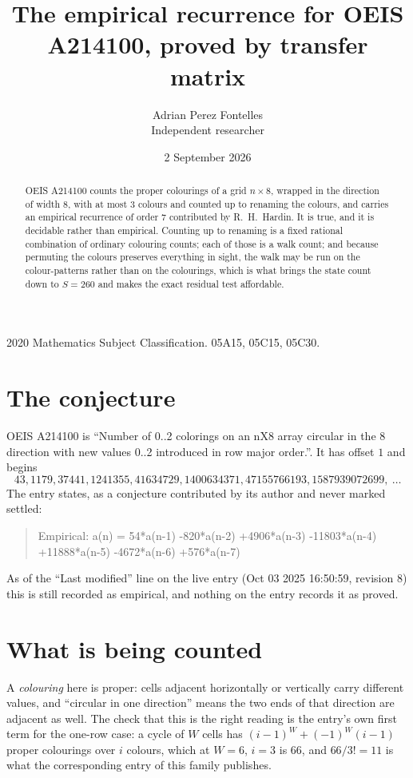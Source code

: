 \documentclass[11pt,a4paper]{article}
\title{The empirical recurrence for OEIS A214100, proved by transfer matrix}
\author{Adrian Perez Fontelles\\ \small Independent researcher}
\date{2 September 2026}
\theoremstyle{plain}
\theoremstyle{definition}
\begin{document}
\maketitle

\begin{abstract}
OEIS A214100 counts the proper colourings of a grid $n\times8$, wrapped in the direction of width $8$, with at most $3$ colours and
counted up to renaming the colours, and carries an empirical recurrence of order $7$
contributed by R.~H.~Hardin. It is true, and it is decidable rather than empirical. Counting
up to renaming is a fixed rational combination of ordinary colouring counts; each of those is
a walk count; and because permuting the colours preserves everything in sight, the walk may be
run on the colour-patterns rather than on the colourings, which is what brings the state count
down to $S=260$ and makes the exact residual test affordable.
\end{abstract}

\noindent\small 2020 Mathematics Subject Classification. 05A15, 05C15, 05C30.\normalsize

\section{The conjecture}

OEIS A214100 is ``Number of 0..2 colorings on an nX8 array circular in the 8 direction with new values 0..2 introduced in row major order.''. It has offset $1$ and begins
\[
43, 1179, 37441, 1241355, 41634729, 1400634371, 47155766193, 1587939072699,\ \dots
\]
The entry states, as a conjecture contributed by its author and never marked settled:
\begin{quote}
Empirical: a(n) = 54*a(n-1) -820*a(n-2) +4906*a(n-3) -11803*a(n-4) +11888*a(n-5) -4672*a(n-6) +576*a(n-7)
\end{quote}
As of the ``Last modified'' line on the live entry (Oct 03 2025 16:50:59, revision 8) this is still
recorded as empirical, and nothing on the entry records it as proved.

\section{What is being counted}

A \emph{colouring} here is proper: cells adjacent horizontally or vertically carry different
values, and ``circular in one direction'' means the two ends of that direction are adjacent as
well. The check that this is the right reading is the entry's own first term for the
one-row case: a cycle of $W$ cells has $(i-1)^W+(-1)^W(i-1)$ proper colourings over $i$
colours, which at $W=6$, $i=3$ is $66$, and $66/3!=11$ is what the corresponding entry of this
family publishes.
\end{document}
